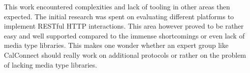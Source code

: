 \documentclass[11pt,a4paper,headsepline,twoside]{scrartcl}		%
\begin{document}
This work encountered complexities and lack of tooling in other areas then
expected. The initial research was spent on evaluating different platforms to
implement RESTful HTTP interactions. This area however proved to be rather easy
and well supported compared to the immense shortcomings or even lack of
media type libraries. This makes one wonder whether an expert group like
CalConnect should really work on additional protocols or rather on the problem
of lacking media type libraries.

\newpage
{}

\end{document}
